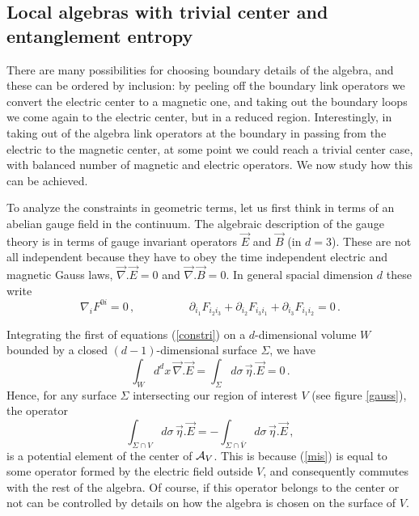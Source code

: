 \documentclass[12pt,a4paper]{article}
\newcommand{\be}{\begin{equation}}
\newcommand{\ee}{\end{equation}}
\def\be{\begin{equation}}
\def\ee{\end{equation}}
\begin{document}
\subsection{Local algebras with trivial center and entanglement entropy}
There are many possibilities for choosing boundary details of the algebra, and these can be ordered by inclusion: by peeling off  
the boundary link operators we convert the electric center to a magnetic one, and taking out the boundary loops we come again to the electric 
center, but in a reduced region. Interestingly, in taking out of the algebra link operators at the boundary in passing from the 
electric to the magnetic center, at some point we could reach a trivial center case, with balanced number of magnetic and electric operators. We now 
study how this can be achieved.  

To analyze the constraints in geometric terms, let us first think in terms of an abelian gauge field in the continuum. The algebraic description of the gauge theory is in terms of gauge invariant 
operators $\vec{E}$ and $\vec{B}$ (in $d=3$). These are not all independent because they have to obey the time independent electric and 
magnetic Gauss laws, $\vec{\nabla}.\vec{E}=0$ and  $\vec{\nabla}.\vec{B}=0$. In general spacial dimension $d$ these write 
\be 
\nabla_i F^{0 i}=0\,, \hspace{2cm}   \partial_{i_1}  F_{i_2 i_3}+\partial_{i_2}  F_{i_3 i_1}+\partial_{i_3}  F_{i_1 i_2}=0\,.\label{constri}
\ee 

Integrating the first of equations (\ref{constri}) on a $d$-dimensional volume $W$ bounded by a closed $(d-1)$-dimensional surface $\Sigma$, we have
\begin{equation}
\int_{W} d^{d}x\,\vec{\nabla}.\vec{E}=\int_\Sigma d\sigma\, \vec{\eta}.\vec{E}=0\,.\label{con1}
\end{equation}
Hence, for any surface $\Sigma$ intersecting our region of interest $V$ (see figure \ref{gauss}), the operator 
\begin{equation}
\int_{\Sigma \cap V} d\sigma \, \vec{\eta}.\vec{E}=-\int_{\Sigma \cap \bar{V}} d\sigma \, \vec{\eta}.\vec{E}\,,\label{mis}
\end{equation}
is a potential element of the center of ${\cal A}_V$. This is because (\ref{mis}) is equal to some operator formed by the electric field  
outside $V$, and consequently commutes with the rest of the algebra. Of course, if this operator belongs to the center or not can be controlled 
by details on how the  algebra is chosen on the surface of $V$.  
\end{document}
